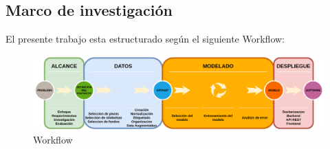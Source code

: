 \subsection{Marco de investigación}
El presente trabajo esta estructurado según el siguiente Workflow:\\
\begin{figure}
    \centering
    \includegraphics[width=1.2\textwidth,center]{img/Wokflow.drawio.png}
    \caption{Workflow}
    \label{fig:workflow}
\end{figure}

